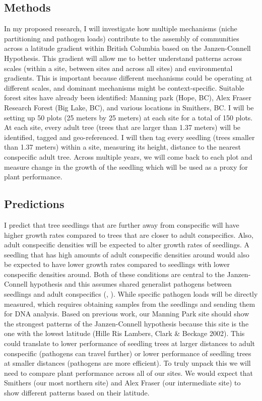 \documentclass{article}
\begin{document}
\subsection{Methods}
In my proposed research, I will investigate how multiple mechanisms (niche partitioning and pathogen loads) contribute to the assembly of communities across a latitude gradient within British Columbia based on the Janzen-Connell Hypothesis. This gradient will allow me to better understand patterns across scales (within a site, between sites and across all sites) and environmental gradients. This is important because different mechanisms could be operating at different scales, and dominant mechanisms might be context-specific. Suitable forest sites have already been identified: Manning park (Hope, BC), Alex Fraser Research Forest (Big Lake, BC), and various locations in Smithers, BC. I will be setting up 50 plots (25 meters by 25 meters) at each site for a total of 150 plots. At each site, every adult tree (trees that are larger than 1.37 meters) will be identified, tagged and geo-referenced. I will then tag every seedling (trees smaller than 1.37 meters) within a site, measuring its height, distance to the nearest conspecific adult tree. Across multiple years, we will come back to each plot and measure change in the growth of the seedling which will be used as a proxy for plant performance.

\subsection{Predictions}
I predict that tree seedlings that are further away from conspecific will have higher growth rates compared to trees that are closer to adult conspecifics. Also, adult conspecific densities will be expected to alter growth rates of seedlings. A seedling that has high amounts of adult conspecific densities around would also be expected to have lower growth rates compared to seedlings with lower conspecific densities around. Both of these conditions are central to the Janzen-Connell hypothesis and this assumes shared generalist pathogens between seedlings and adult conspecifics (\citep{Janzen1970}, \citep{Connell1978}). While specific pathogen loads will be directly measured, which requires obtaining samples from the seedlings and sending them for DNA analysis. Based on previous work, our Manning Park site should show the strongest patterns of the Janzen-Connell hypothesis because this site is the one with the lowest latitude (Hille Ris Lambers, Clark & Beckage 2002). This could translate to lower performance of seedling trees at larger distances to adult conspecific (pathogens can travel further) or lower performance of seedling trees at smaller distances (pathogens are more efficient). To truly unpack this we will need to compare plant performance across all of our sites. We would expect that Smithers (our most northern site) and Alex Fraser (our intermediate site) to show different patterns based on their latitude. 
\end{document}
